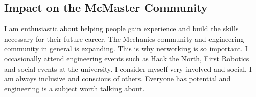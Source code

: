 \documentclass[14pt, a4paper]{awesome-cv}
\begin{document}
\begin{cvletter}
\section*{Impact on the McMaster Community}
I am enthusiastic about helping people gain experience and build the skills necessary for their future career.  The Mechanics community and engineering community in general is expanding.  This is why networking is so important.  I occasionally attend engineering events such as Hack the North, First Robotics and social events at the university.  I consider myself very involved and social.  I am always inclusive and conscious of others.  Everyone has potential and engineering is a subject worth talking about.

\end{cvletter}

\makeletterclosing
\end{document}
